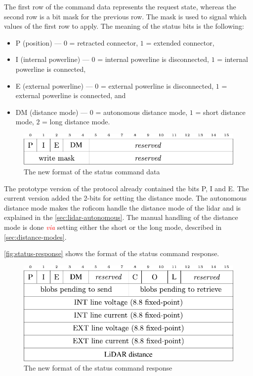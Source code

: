 \documentclass[
  digital,     %
  oneside,     %
  nosansbold,  %
  nocolorbold, %
  nolof,         %
  nolot,         %
]{fithesis4}
\newcommand{\TODO}[1]{\textcolor{red}{\textit{#1}}}
\begin{document}
{{{The first row of the command data represents the request state, whereas the second row is a bit mask for the previous row. The mask is used to signal which values of the first row to apply. The meaning of the status bits is the following:

\begin{itemize}
    \item P (position) --- $0$ = retracted connector, $1$ = extended connector,
    \item I (internal powerline) --- $0$ = internal powerline is disconnected, $1$ = internal powerline is connected,
    \item E (external powerline) --- $0$ = external powerline is disconnected, $1$ = external powerline is connected, and
    \item DM (distance mode) --- $0$ = autonomous distance mode, $1$ = short distance mode, $2$ = long distance mode. 
\end{itemize}

\begin{figure}
    \includegraphics[width=\textwidth,height=\textheight,keepaspectratio]{assets/status_command_new.pdf}
    \caption[Status command data]{The new format of the status command data}
    \label{fig:status-command}
\end{figure}

The prototype version of the protocol already contained the bits P, I and E. The current version added the 2-bits for setting the distance mode. The autonomous distance mode makes the \acrshort{roficom} handle the distance mode of the \acrshort{lidar} and is explained in the \autoref{sec:lidar-autonomous}. The manual handling of the distance mode is done \TODO{via} setting either the short or the long mode, described in \autoref{sec:distance-modes}.

\autoref{fig:status-response} shows the format of the status command response.

\begin{figure}
    \includegraphics[width=\textwidth,height=\textheight,keepaspectratio]{assets/status_response_new.pdf}
    \caption[Status command response]{The new format of the status command response}
    \label{fig:status-response}
\end{figure}

}}}
\end{document}
